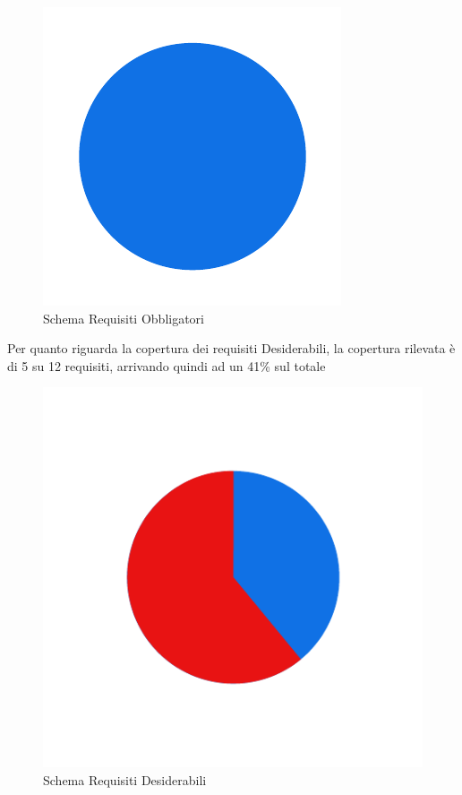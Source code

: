 \begin{figure}[H]
    \centering
    \includegraphics[width=\textwidth]{images/requisiti_o.png}
    \caption{Schema Requisiti Obbligatori}
    \label{fig:Requisiti Obbligatori}
\end{figure}

\newpage

Per quanto riguarda la copertura dei requisiti Desiderabili, la copertura rilevata è di 5 su 12
requisiti, arrivando quindi ad un 41\% sul totale
\begin{figure}[H]
    \centering
    \includegraphics[width=\textwidth]{images/requisiti_d.png}
    \caption{Schema Requisiti Desiderabili}
    \label{fig:Requisiti Desiderabili}
\end{figure}

